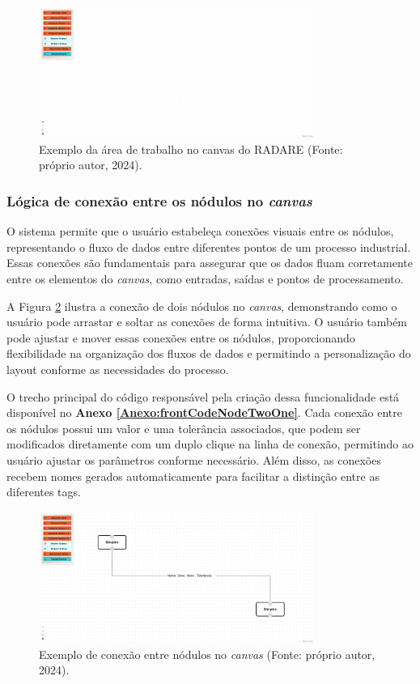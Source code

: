 \begin{figure}[htbp]
    \centering
    \includegraphics[width=0.8\textwidth]{figuras/empty-canvas.png}
    \caption{Exemplo da área de trabalho no canvas do RADARE (Fonte: próprio autor, 2024).}
    \label{Fig:EmptyCanvas}
\end{figure}

\subsubsection{Lógica de conexão entre os nódulos no \textit{canvas}}

O sistema permite que o usuário estabeleça conexões visuais entre os nódulos, representando o fluxo de dados entre diferentes pontos de um processo industrial. Essas conexões são fundamentais para assegurar que os dados fluam corretamente entre os elementos do \textit{canvas}, como entradas, saídas e pontos de processamento.

A Figura \ref{Fig:NodeConnections} ilustra a conexão de dois nódulos no \textit{canvas}, demonstrando como o usuário pode arrastar e soltar as conexões de forma intuitiva. O usuário também pode ajustar e mover essas conexões entre os nódulos, proporcionando flexibilidade na organização dos fluxos de dados e permitindo a personalização do layout conforme as necessidades do processo.

O trecho principal do código responsável pela criação dessa funcionalidade está disponível no \textbf{Anexo \ref{Anexo:frontCodeNodeTwoOne}}. Cada conexão entre os nódulos possui um valor e uma tolerância associados, que podem ser modificados diretamente com um duplo clique na linha de conexão, permitindo ao usuário ajustar os parâmetros conforme necessário. Além disso, as conexões recebem nomes gerados automaticamente para facilitar a distinção entre as diferentes tags.

\begin{figure}[htbp]
    \centering
    \includegraphics[width=0.8\textwidth]{figuras/node-connection-example.png}
    \caption{Exemplo de conexão entre nódulos no \textit{canvas} (Fonte: próprio autor, 2024).}
    \label{Fig:NodeConnections}
\end{figure}

